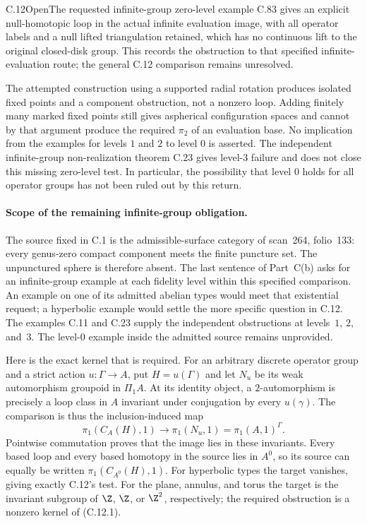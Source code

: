 \begin{claim}{C.12}{Open}{The requested infinite-group zero-level example}
C.83 gives an explicit null-homotopic loop in the actual infinite evaluation image, with all operator labels and a null lifted triangulation retained, which has no continuous lift to the original closed-disk group. This records the obstruction to that specified infinite-evaluation route; the general C.12 comparison remains unresolved.

\end{claim}
The attempted construction using a supported radial rotation produces
isolated fixed points and a component obstruction, not a nonzero loop.
Adding finitely many marked fixed points still gives aspherical
configuration spaces and cannot by that argument produce the required
$\pi_2$ of an evaluation base. No implication from the examples for
levels $1$ and $2$ to level $0$ is asserted. The independent infinite-group
non-realization theorem C.23 gives level-$3$ failure and does not close
this missing zero-level test. In particular, the possibility that level
$0$ holds for all operator groups has not been ruled out by this return.

\paragraph{Scope of the remaining infinite-group obligation.}
The source fixed in C.1 is the admissible-surface category of scan~264,
folio~133: every genus-zero compact component meets the finite puncture
set. The unpunctured sphere is therefore absent. The last sentence of
Part~C(b) asks for an infinite-group example at each fidelity level
within this specified comparison. An example on one of its admitted
abelian types would meet that existential request; a hyperbolic example
would settle the more specific question in C.12. The examples C.11 and
C.23 supply the independent obstructions at levels~$1$, $2$, and~$3$.
The level-$0$ example inside the admitted source remains unprovided.

Here is the exact kernel that is required. For an arbitrary discrete
operator group and a strict action $u:\Gamma\to A$, put
$H=u(\Gamma)$ and let $N_u$ be its weak automorphism groupoid in
$\Pi_1A$. At its identity object, a $2$-automorphism is precisely a
loop class in $A$ invariant under conjugation by every $u(\gamma)$.
The comparison is thus the inclusion-induced map
\[
 \pi_1(C_A(H),1)\longrightarrow
 \pi_1(N_u,1)=\pi_1(A,1)^\Gamma.                 \tag{C.12.1}
\]
Pointwise commutation proves that the image lies in these invariants.
Every based loop and every based homotopy in the source lies in $A^0$,
so its source can equally be written $\pi_1(C_{A^0}(H),1)$.
For hyperbolic types the target vanishes, giving exactly C.12's test.
For the plane, annulus, and torus the target is the invariant subgroup
of $\Z$, $\Z$, or $\Z^2$, respectively; the required obstruction is a
nonzero kernel of (C.12.1).

